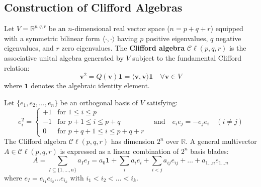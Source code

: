 \subsection{Construction of Clifford Algebras}
\begin{definition}
Let $V = \mathbb{R}^{p,q,r}$ be an $n$-dimensional real vector space ($n = p + q + r$) equipped with a symmetric bilinear form $\langle \cdot, \cdot \rangle$ having $p$ positive eigenvalues, $q$ negative eigenvalues, and $r$ zero eigenvalues. The \textbf{Clifford algebra} $\mathcal{C}\ell(p,q,r)$ is the associative unital algebra generated by $V$ subject to the fundamental Clifford relation:
\begin{equation}
    \mathbf{v}^2 = Q(\mathbf{v}) \mathbf{1} = \langle \mathbf{v}, \mathbf{v} \rangle \mathbf{1} \quad \forall \mathbf{v} \in V
\end{equation}
where $\mathbf{1}$ denotes the algebraic identity element.
\end{definition}

Let $\{e_1, e_2, \dots, e_n\}$ be an orthogonal basis of $V$ satisfying:
\begin{equation}
    e_i^2 = \begin{cases}
        +1 & \text{for } 1 \le i \le p \\
        -1 & \text{for } p+1 \le i \le p+q \\
        0  & \text{for } p+q+1 \le i \le p+q+r
    \end{cases}
    \quad \text{and} \quad
    e_i e_j = -e_j e_i \quad (i \neq j)
\end{equation}
The Clifford algebra $\mathcal{C}\ell(p,q,r)$ has dimension $2^n$ over $\mathbb{R}$. A general multivector $A \in \mathcal{C}\ell(p,q,r)$ is expressed as a linear combination of $2^n$ basis blades:
\begin{equation}
    A = \sum_{I \subseteq \{1,\dots,n\}} a_I e_I = a_0 \mathbf{1} + \sum_{i} a_i e_i + \sum_{i<j} a_{ij} e_{ij} + \dots + a_{1\dots n} e_{1\dots n}
\end{equation}
where $e_I = e_{i_1} e_{i_2} \dots e_{i_k}$ with $i_1 < i_2 < \dots < i_k$.

